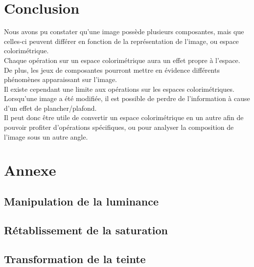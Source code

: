 \documentclass[a4paper]{article}
\begin{document}
\section{Conclusion}
Nous avons pu constater qu'une image possède plusieurs composantes, mais que celles-ci peuvent différer en fonction de la représentation de l'image, ou espace colorimétrique.\\

Chaque opération sur un espace colorimétrique aura un effet propre à l'espace. De plus, les jeux de composantes pourront mettre en évidence différents phénomènes apparaissant sur l'image.\\
Il existe cependant une limite aux opérations sur les espaces colorimétriques. Lorsqu'une image a été modifiée, il est possible de perdre de l'information à cause d'un effet de plancher/plafond.\\

Il peut donc être utile de convertir un espace colorimétrique en un autre afin de pouvoir profiter d'opérations spécifiques, ou pour analyser la composition de l'image sous un autre angle.

\clearpage

\section{Annexe}

\subsection{Manipulation de la luminance}


\subsection{Rétablissement de la saturation}


\subsection{Transformation de la teinte}

\end{document}
